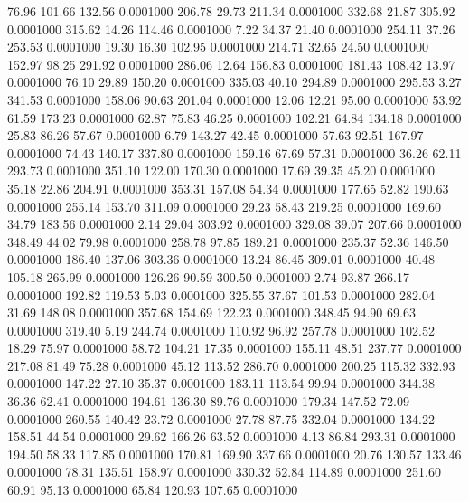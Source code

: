   76.96  101.66  132.56   0.0001000
 206.78   29.73  211.34   0.0001000
 332.68   21.87  305.92   0.0001000
 315.62   14.26  114.46   0.0001000
   7.22   34.37   21.40   0.0001000
 254.11   37.26  253.53   0.0001000
  19.30   16.30  102.95   0.0001000
 214.71   32.65   24.50   0.0001000
 152.97   98.25  291.92   0.0001000
 286.06   12.64  156.83   0.0001000
 181.43  108.42   13.97   0.0001000
  76.10   29.89  150.20   0.0001000
 335.03   40.10  294.89   0.0001000
 295.53    3.27  341.53   0.0001000
 158.06   90.63  201.04   0.0001000
  12.06   12.21   95.00   0.0001000
  53.92   61.59  173.23   0.0001000
  62.87   75.83   46.25   0.0001000
 102.21   64.84  134.18   0.0001000
  25.83   86.26   57.67   0.0001000
   6.79  143.27   42.45   0.0001000
  57.63   92.51  167.97   0.0001000
  74.43  140.17  337.80   0.0001000
 159.16   67.69   57.31   0.0001000
  36.26   62.11  293.73   0.0001000
 351.10  122.00  170.30   0.0001000
  17.69   39.35   45.20   0.0001000
  35.18   22.86  204.91   0.0001000
 353.31  157.08   54.34   0.0001000
 177.65   52.82  190.63   0.0001000
 255.14  153.70  311.09   0.0001000
  29.23   58.43  219.25   0.0001000
 169.60   34.79  183.56   0.0001000
   2.14   29.04  303.92   0.0001000
 329.08   39.07  207.66   0.0001000
 348.49   44.02   79.98   0.0001000
 258.78   97.85  189.21   0.0001000
 235.37   52.36  146.50   0.0001000
 186.40  137.06  303.36   0.0001000
  13.24   86.45  309.01   0.0001000
  40.48  105.18  265.99   0.0001000
 126.26   90.59  300.50   0.0001000
   2.74   93.87  266.17   0.0001000
 192.82  119.53    5.03   0.0001000
 325.55   37.67  101.53   0.0001000
 282.04   31.69  148.08   0.0001000
 357.68  154.69  122.23   0.0001000
 348.45   94.90   69.63   0.0001000
 319.40    5.19  244.74   0.0001000
 110.92   96.92  257.78   0.0001000
 102.52   18.29   75.97   0.0001000
  58.72  104.21   17.35   0.0001000
 155.11   48.51  237.77   0.0001000
 217.08   81.49   75.28   0.0001000
  45.12  113.52  286.70   0.0001000
 200.25  115.32  332.93   0.0001000
 147.22   27.10   35.37   0.0001000
 183.11  113.54   99.94   0.0001000
 344.38   36.36   62.41   0.0001000
 194.61  136.30   89.76   0.0001000
 179.34  147.52   72.09   0.0001000
 260.55  140.42   23.72   0.0001000
  27.78   87.75  332.04   0.0001000
 134.22  158.51   44.54   0.0001000
  29.62  166.26   63.52   0.0001000
   4.13   86.84  293.31   0.0001000
 194.50   58.33  117.85   0.0001000
 170.81  169.90  337.66   0.0001000
  20.76  130.57  133.46   0.0001000
  78.31  135.51  158.97   0.0001000
 330.32   52.84  114.89   0.0001000
 251.60   60.91   95.13   0.0001000
  65.84  120.93  107.65   0.0001000
